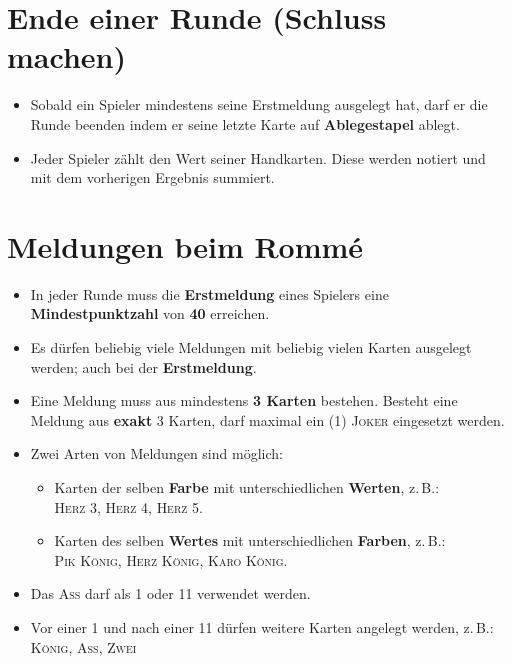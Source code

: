 \documentclass[a4paper,12pt,twoside]{article}
\begin{document}
\section{Ende einer Runde (Schluss machen)}

\begin{itemize}
    \item Sobald ein Spieler mindestens seine Erstmeldung ausgelegt hat, darf er die Runde beenden indem er seine letzte Karte auf \textbf{Ablegestapel} ablegt.
    \item Jeder Spieler zählt den Wert seiner Handkarten. Diese werden notiert und mit dem vorherigen Ergebnis summiert.
\end{itemize}



\clearpage

\section{Meldungen beim Rommé}

\begin{itemize}
    \item In jeder Runde muss die \textbf{Erstmeldung} eines Spielers eine \textbf{Mindestpunktzahl} von \textbf{40} erreichen.
    \item Es dürfen beliebig viele Meldungen mit beliebig vielen Karten ausgelegt werden; auch bei der \textbf{Erstmeldung}.
    \item Eine Meldung muss aus mindestens \textbf{3 Karten} bestehen. Besteht eine Meldung aus \textbf{exakt} 3 Karten, darf maximal ein (1) \textsc{Joker} eingesetzt werden.
    \item Zwei Arten von Meldungen sind möglich:
    \begin{itemize}
        \item Karten der selben \textbf{Farbe} mit unterschiedlichen \textbf{Werten}, z.\,B.:\\\textsc{Herz 3}, \textsc{Herz 4}, \textsc{Herz 5}.
        \item Karten des selben \textbf{Wertes} mit unterschiedlichen \textbf{Farben}, z.\,B.:\\\textsc{Pik König}, \textsc{Herz König}, \textsc{Karo König}.
    \end{itemize}
    \item Das \textsc{Ass} darf als 1 oder 11 verwendet werden.
    \item Vor einer 1 und nach einer 11 dürfen weitere Karten angelegt werden, z.\,B.: \textsc{König}, \textsc{Ass}, \textsc{Zwei}
\end{itemize}
\end{document}
